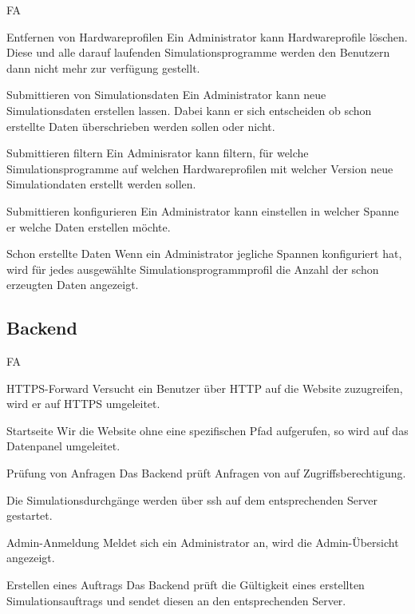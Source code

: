 \begin{Kriterien}{FA}
    \item[Entfernen von Hardwareprofilen] Ein Administrator kann Hardwareprofile löschen. Diese und alle darauf laufenden Simulationsprogramme werden den Benutzern dann nicht mehr zur verfügung gestellt.



    \item[Submittieren von Simulationsdaten] Ein Administrator kann neue Simulationsdaten erstellen lassen. Dabei kann er sich entscheiden ob schon erstellte Daten überschrieben werden sollen oder nicht.

    \item[Submittieren filtern] Ein Adminisrator kann filtern, für welche Simulationsprogramme auf welchen Hardwareprofilen mit welcher Version neue Simulationdaten erstellt werden sollen.

    \item[Submittieren konfigurieren] Ein Administrator kann einstellen in welcher Spanne er welche Daten erstellen möchte.

    \item[Schon erstellte Daten] Wenn ein Administrator jegliche Spannen konfiguriert hat, wird für jedes ausgewählte Simulationsprogrammprofil die Anzahl der schon erzeugten Daten angezeigt.

\end{Kriterien}

\subsection{Backend}
\begin{Kriterien}{FA}

    \item[HTTPS-Forward] Versucht ein Benutzer über HTTP auf die Website zuzugreifen, wird er auf HTTPS umgeleitet.

    \item[Startseite] Wir die Website ohne eine spezifischen Pfad aufgerufen, so wird auf das Datenpanel umgeleitet.

	\item[Prüfung von Anfragen] Das Backend prüft Anfragen von  auf Zugriffsberechtigung.

    \item Die Simulationsdurchgänge werden über ssh auf dem entsprechenden Server gestartet.

	\item[Admin-Anmeldung] Meldet sich ein \gls{Administrator} an, wird die Admin-Übersicht angezeigt.

	\item[Erstellen eines Auftrags] Das Backend prüft die Gültigkeit eines erstellten Simulationsauftrags und sendet diesen an den entsprechenden Server.



\end{Kriterien}


